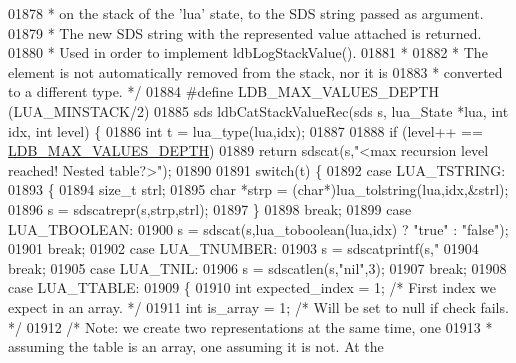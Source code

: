 \begin{DoxyCode}
{{{{{{{{{{{{{{{01878 \textcolor{comment}{ * on the stack of the 'lua' state, to the SDS string passed as argument.}
01879 \textcolor{comment}{ * The new SDS string with the represented value attached is returned.}
01880 \textcolor{comment}{ * Used in order to implement ldbLogStackValue().}
01881 \textcolor{comment}{ *}
01882 \textcolor{comment}{ * The element is not automatically removed from the stack, nor it is}
01883 \textcolor{comment}{ * converted to a different type. */}
01884 \textcolor{preprocessor}{#}\textcolor{preprocessor}{define} \textcolor{preprocessor}{LDB\_MAX\_VALUES\_DEPTH} \textcolor{preprocessor}{(}\textcolor{preprocessor}{LUA\_MINSTACK}\textcolor{preprocessor}{/}2\textcolor{preprocessor}{)}
01885 sds ldbCatStackValueRec(sds s, lua\_State *lua, \textcolor{keywordtype}{int} idx, \textcolor{keywordtype}{int} level) \{
01886     \textcolor{keywordtype}{int} t = lua\_type(lua,idx);
01887 
01888     \textcolor{keywordflow}{if} (level++ == \hyperlink{scripting_8c_a710b4655ec5cbdef50fc86e83d6891ef}{LDB\_MAX\_VALUES\_DEPTH})
01889         \textcolor{keywordflow}{return} sdscat(s,\textcolor{stringliteral}{"<max recursion level reached! Nested table?>"});
01890 
01891     \textcolor{keywordflow}{switch}(t) \{
01892     \textcolor{keywordflow}{case} LUA\_TSTRING:
01893         \{
01894         size\_t strl;
01895         \textcolor{keywordtype}{char} *strp = (\textcolor{keywordtype}{char}*)lua\_tolstring(lua,idx,&strl);
01896         s = sdscatrepr(s,strp,strl);
01897         \}
01898         \textcolor{keywordflow}{break};
01899     \textcolor{keywordflow}{case} LUA\_TBOOLEAN:
01900         s = sdscat(s,lua\_toboolean(lua,idx) ? \textcolor{stringliteral}{"true"} : \textcolor{stringliteral}{"false"});
01901         \textcolor{keywordflow}{break};
01902     \textcolor{keywordflow}{case} LUA\_TNUMBER:
01903         s = sdscatprintf(s,\textcolor{stringliteral}{"%
01904         \textcolor{keywordflow}{break};
01905     \textcolor{keywordflow}{case} LUA\_TNIL:
01906         s = sdscatlen(s,\textcolor{stringliteral}{"nil"},3);
01907         \textcolor{keywordflow}{break};
01908     \textcolor{keywordflow}{case} LUA\_TTABLE:
01909         \{
01910         \textcolor{keywordtype}{int} expected\_index = 1; \textcolor{comment}{/* First index we expect in an array. */}
01911         \textcolor{keywordtype}{int} is\_array = 1; \textcolor{comment}{/* Will be set to null if check fails. */}
01912         \textcolor{comment}{/* Note: we create two representations at the same time, one}
01913 \textcolor{comment}{         * assuming the table is an array, one assuming it is not. At the}
}}}}}}}}}}}}}}}}
\end{DoxyCode}
